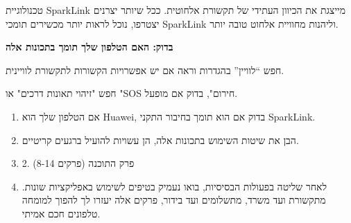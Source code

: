 
טכנולוגיית SparkLink מייצגת את הכיוון העתידי של תקשורת אלחוטית. ככל שיותר יצרנים יצטרפו, נוכל לראות יותר מכשירים תומכי SparkLink וליהנות מחוויית אלחוט טובה יותר.

\textbf{בדוק: האם הטלפון שלך תומך בתכונות אלה}\par

חפש “לוויין” בהגדרות וראה אם יש אפשרויות הקשורות לתקשורת לוויינית.

\begin{tcbpractice}{חפש "זיהוי תאונות דרכים" או "SOS חירום", בדוק אם מופעל.}
\begin{enumerate}
  \item אם הטלפון שלך הוא Huawei, בדוק אם הוא תומך בחיבור התקני SparkLink.
  \item הבן את שיטות השימוש בתכונות אלה, הן עשויות להועיל ברגעים קריטיים.
  \item 2. פרק התוכנה (פרקים 8-14)
  \item לאחר שליטה בפעולות הבסיסיות, בואו נעמיק בטיפים לשימוש באפליקציות שונות. מתקשורת ועד משרד, מתשלומים ועד בידור, פרקים אלה יעזרו לך להפוך למומחה טלפונים חכם אמיתי.
\end{enumerate}

\end{tcbpractice}

